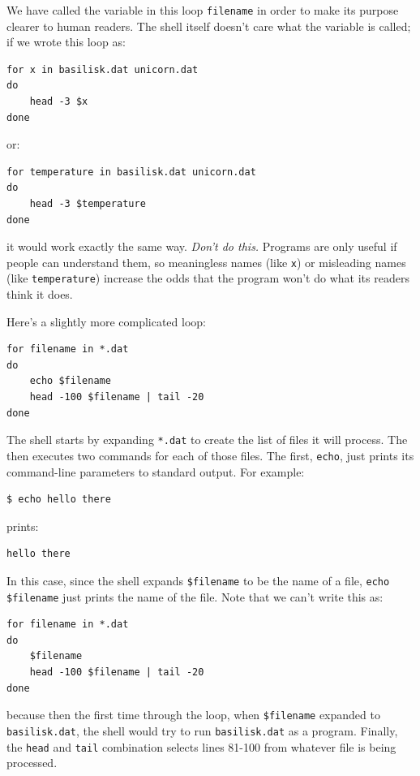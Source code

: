 \documentclass{book}
\begin{document}
We have called the variable in this loop \texttt{filename} in order to
make its purpose clearer to human readers. The shell itself doesn't care
what the variable is called; if we wrote this loop as:

\begin{verbatim}
for x in basilisk.dat unicorn.dat
do
    head -3 $x
done
\end{verbatim}

or:

\begin{verbatim}
for temperature in basilisk.dat unicorn.dat
do
    head -3 $temperature
done
\end{verbatim}

it would work exactly the same way. \emph{Don't do this.} Programs are
only useful if people can understand them, so meaningless names (like
\texttt{x}) or misleading names (like \texttt{temperature}) increase the
odds that the program won't do what its readers think it does.

Here's a slightly more complicated loop:

\begin{verbatim}
for filename in *.dat
do
    echo $filename
    head -100 $filename | tail -20
done
\end{verbatim}

The shell starts by expanding \texttt{*.dat} to create the list of files
it will process. The  then executes two
commands for each of those files. The first, \texttt{echo}, just prints
its command-line parameters to standard output. For example:

\begin{verbatim}
$ echo hello there
\end{verbatim}

prints:

\begin{verbatim}
hello there
\end{verbatim}

In this case, since the shell expands \texttt{\$filename} to be the name
of a file, \texttt{echo \$filename} just prints the name of the file.
Note that we can't write this as:

\begin{verbatim}
for filename in *.dat
do
    $filename
    head -100 $filename | tail -20
done
\end{verbatim}

because then the first time through the loop, when \texttt{\$filename}
expanded to \texttt{basilisk.dat}, the shell would try to run
\texttt{basilisk.dat} as a program. Finally, the \texttt{head} and
\texttt{tail} combination selects lines 81-100 from whatever file is
being processed.
\end{document}
